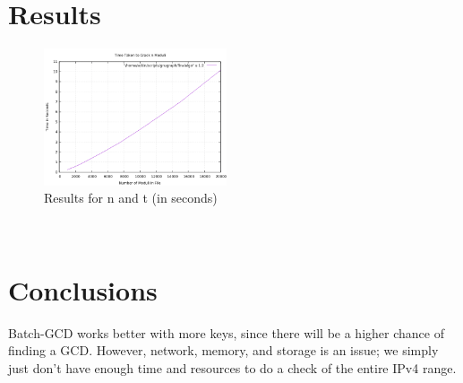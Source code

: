 \documentclass[10pt, letterpaper]{article}
\begin{document}
\section{Results}
\begin{figure}
  \begin{center}
    \includegraphics[width=0.48\textwidth]{batch-gcd-time.png}
  \end{center}
  \caption{Results for n and t (in seconds)}
\end{figure}
\\

\section{Conclusions}
Batch-GCD works better with more keys, since there will be a higher chance of finding a GCD. However, network, memory, and storage is an issue; we simply just don't have enough time and resources to do a check of the entire IPv4 range.
\end{document}
